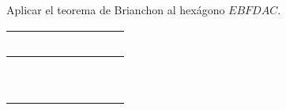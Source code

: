 \newpage
\begin{section-exercise}
    Aplicar el teorema de Brianchon al hexágono $EBFDAC$. \hspace{1cm}
    \begin{tabular}{|c|c|c|}
        \hline
        \ \ \ \ && \\\hline
        &\ \ \ \ & \\\hline\hline
        &&\ \ \ \ \\\hline
    \end{tabular}
    \vspace*{\fill}
    \begin{figure}[H]
        \centering
        
    \end{figure}
    \vspace*{\fill}
\end{section-exercise}